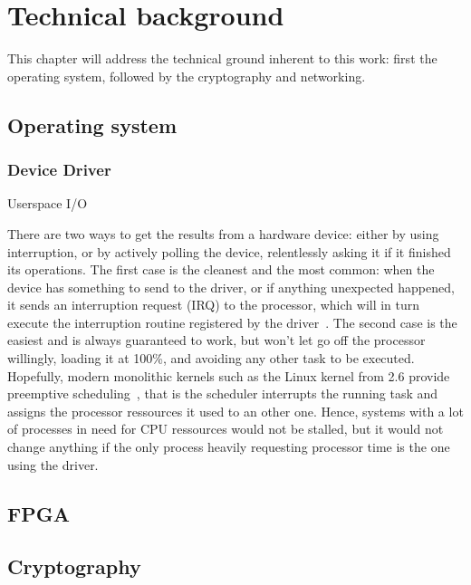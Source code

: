 \chapter{Technical background}

This chapter will address the technical ground inherent to this work: first the operating system, followed by the cryptography and networking.

\section{Operating system}



\subsection{Device Driver}\label{sec:theory-driver}
Userspace I/O~\cite{koch2011}

There are two ways to get the results from a hardware device: either by using interruption, or by actively polling the device, relentlessly asking it if it finished its operations.
The first case is the cleanest and the most common: when the device has something to send to the driver, or if anything unexpected happened, it sends an interruption request (IRQ) to the processor, which will in turn execute the interruption routine registered by the driver~\citep[chap. 10]{Corbet:2005:LDD:1209083}.
The second case is the easiest and is always guaranteed to work, but won't let go off the processor willingly, loading it at 100\%, and avoiding any other task to be executed.
Hopefully, modern monolithic kernels such as the Linux kernel from 2.6 provide preemptive scheduling~\cite{Santhanam2003}, that is the scheduler interrupts the running task and assigns the processor ressources it used to an other one.
Hence, systems with a lot of processes in need for CPU ressources would not be stalled, but it would not change anything if the only process heavily requesting processor time is the one using the driver.

\section{FPGA}

\section{Cryptography}

